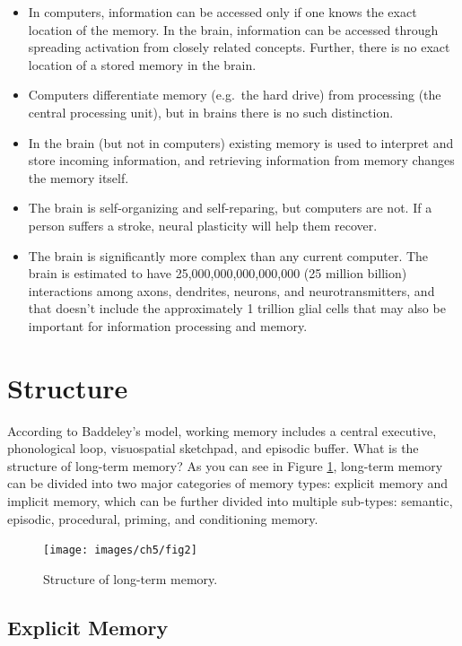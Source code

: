 \documentclass[
]{krantz}
\providecommand{\tightlist}{%
  \setlength{\itemsep}{0pt}\setlength{\parskip}{0pt}}
\begin{document}
\begin{itemize}
\tightlist
\item
  In computers, information can be accessed only if one knows the exact location of the memory. In the brain, information can be accessed through spreading activation from closely related concepts. Further, there is no exact location of a stored memory in the brain.
\item
  Computers differentiate memory (e.g.~the hard drive) from processing (the central processing unit), but in brains there is no such distinction.
\item
  In the brain (but not in computers) existing memory is used to interpret and store incoming information, and retrieving information from memory changes the memory itself.
\item
  The brain is self-organizing and self-reparing, but computers are not. If a person suffers a stroke, neural plasticity will help them recover.
\item
  The brain is significantly more complex than any current computer. The brain is estimated to have 25,000,000,000,000,000 (25 million billion) interactions among axons, dendrites, neurons, and neurotransmitters, and that doesn't include the approximately 1 trillion glial cells that may also be important for information processing and memory.
\end{itemize}

\section{Structure}\label{structure}

According to Baddeley's model, working memory includes a central executive, phonological loop, visuospatial sketchpad, and episodic buffer. What is the structure of long-term memory? As you can see in Figure \ref{fig:structure}, long-term memory can be divided into two major categories of memory types: explicit memory and implicit memory, which can be further divided into multiple sub-types: semantic, episodic, procedural, priming, and conditioning memory.

\begin{figure}

{\centering \texttt{[image: images/ch5/fig2]} 

}

\caption{Structure of long-term memory.}\label{fig:structure}
\end{figure}

\subsection*{Explicit Memory}\label{explicit-memory}
\end{document}
